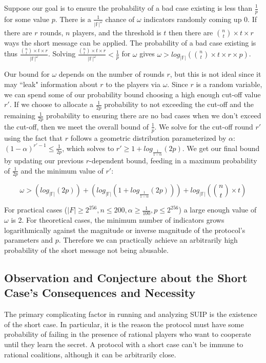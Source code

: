 \documentclass[12pt]{dalcsthesis}
\begin{document}
Suppose our goal is to ensure the probability of a bad case existing is less than $\frac{1}{p}$ for some value $p$. There is a $\frac{1}{|\mathbb{F}|^\omega}$ chance of $\omega$ indicators randomly coming up 0. If there are $r$ rounds, $n$ players, and the threshold is $t$ then there are $\binom{n}{t} \times t \times r$ ways the short message can be applied. The probability of a bad case existing is thus $\frac{\binom{n}{t} \times t \times r}{|\mathbb{F}|^\omega}$. Solving $\frac{\binom{n}{t} \times t \times r}{|\mathbb{F}|^\omega} < \frac{1}{p}$ for $\omega$ gives $\omega > log_{|\mathbb{F}|} (\binom{n}{t} \times t \times r \times p)$.

Our bound for $\omega$ depends on the number of rounds $r$, but this is not ideal since it may ``leak" information about $r$ to the players via $\omega$. Since $r$ is a random variable, we can spend some of our probability bound choosing a high enough cut-off value $r'$. If we choose to allocate a $\frac{1}{2 p}$ probability to not exceeding the cut-off and the remaining $\frac{1}{2 p}$ probability to ensuring there are no bad cases when we don't exceed the cut-off, then we meet the overall bound of $\frac{1}{p}$. We solve for the cut-off round $r'$ using the fact that $r$ follows a geometric distribution parameterized by $\alpha$: $(1 - \alpha)^{r'-1} \leq \frac{1}{2 p}$, which solves to $r' \geq 1 + log_{\frac{1}{1-\alpha}}(2 p)$. We get our final bound by updating our previous $r$-dependent bound, feeding in a maximum probability of $\frac{1}{2 p}$ and the minimum value of $r'$:

$$\omega > \left(log_{|\mathbb{F}|} (2 p)\right) + \left(log_{|\mathbb{F}|} \left(1 + log_{\frac{1}{1-\alpha}}(2 p)\right)\right) + log_{|\mathbb{F}|} \left(\binom{n}{t} \times t\right)$$

For practical cases ($|F| \geq 2^{256}, n \leq 200, \alpha \geq \frac{1}{100}, p \leq 2^{256}$) a large enough value of $\omega$ is 2. For theoretical cases, the minimum number of indicators grows logarithmically against the magnitude or inverse magnitude of the protocol's parameters and $p$. Therefore we can practically achieve an arbitrarily high probability of the short message not being abusable.

\subsection{Observation and Conjecture about the Short Case's Consequences and Necessity}

The primary complicating factor in running and analyzing SUIP is the existence of the short case. In particular, it is the reason the protocol must have some probability of failing in the presence of rational players who want to cooperate until they learn the secret. A protocol with a short case can't be immune to rational coalitions, although it can be arbitrarily close.
\end{document}
